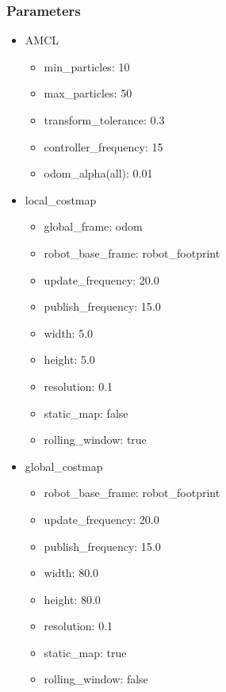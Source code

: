 \documentclass[10pt,journal,compsoc]{IEEEtran}
\begin{document}
\subsubsection{Parameters}

\begin{itemize}
\item AMCL \begin{itemize}
\item	min\_particles: 10
\item max\_particles: 50
\item transform\_tolerance: 0.3
\item controller\_frequency: 15
\item odom\_alpha(all): 0.01
\end{itemize}

\item local\_costmap
\begin{itemize}
 \item  global\_frame: odom
 \item  robot\_base\_frame: robot\_footprint
 \item  update\_frequency: 20.0
  \item publish\_frequency: 15.0
 \item  width: 5.0
 \item  height: 5.0
 \item  resolution: 0.1
 \item  static\_map: false
  \item rolling\_window: true
\end{itemize}

\item global\_costmap
\begin{itemize}
  \item robot\_base\_frame: robot\_footprint
  \item update\_frequency: 20.0
  \item publish\_frequency: 15.0
  \item width: 80.0
  \item height: 80.0
  \item resolution: 0.1
  \item static\_map: true
  \item rolling\_window: false
\end{itemize}



\end{itemize}
\end{document}
